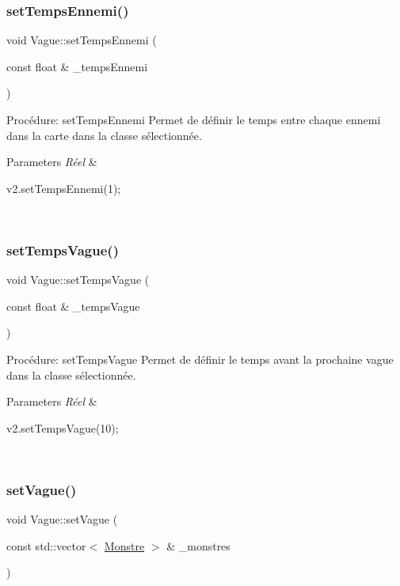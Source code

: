 \subsubsection{\texorpdfstring{set\+Temps\+Ennemi()}{setTempsEnnemi()}}
{\footnotesize\ttfamily void Vague\+::set\+Temps\+Ennemi (\begin{DoxyParamCaption}\item[{const float \&}]{\+\_\+temps\+Ennemi }\end{DoxyParamCaption})}



Procédure\+: set\+Temps\+Ennemi Permet de définir le temps entre chaque ennemi dans la carte dans la classe sélectionnée. 


\begin{DoxyParams}{Parameters}
{\em Réel} & 
\begin{DoxyCode}
v2.setTempsEnnemi(1);
\end{DoxyCode}
 \\
\hline
\end{DoxyParams}
\mbox{\label{classVague_a3c9775c8351b1581afba79c0fd87171a}} 
\subsubsection{\texorpdfstring{set\+Temps\+Vague()}{setTempsVague()}}
{\footnotesize\ttfamily void Vague\+::set\+Temps\+Vague (\begin{DoxyParamCaption}\item[{const float \&}]{\+\_\+temps\+Vague }\end{DoxyParamCaption})}



Procédure\+: set\+Temps\+Vague Permet de définir le temps avant la prochaine vague dans la classe sélectionnée. 


\begin{DoxyParams}{Parameters}
{\em Réel} & 
\begin{DoxyCode}
v2.setTempsVague(10);
\end{DoxyCode}
 \\
\hline
\end{DoxyParams}
\mbox{\label{classVague_af6bc246e66011691775c3ceb9356ffc8}} 
\subsubsection{\texorpdfstring{set\+Vague()}{setVague()}}
{\footnotesize\ttfamily void Vague\+::set\+Vague (\begin{DoxyParamCaption}\item[{const std\+::vector$<$ \hyperlink{classMonstre}{Monstre} $>$ \&}]{\+\_\+monstres }\end{DoxyParamCaption})}




